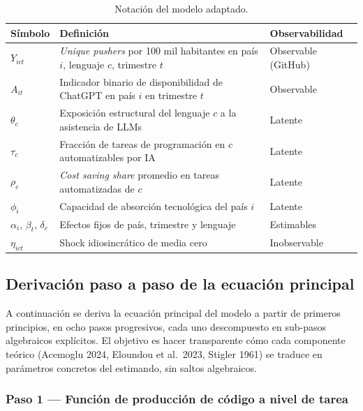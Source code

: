 \documentclass[11pt,a4paper]{article}
\theoremstyle{definition}
\begin{document}
\begin{table}[h!]
\centering
\small
\renewcommand{\arraystretch}{1.30}
\begin{tabular}{p{1.6cm}p{8cm}p{4cm}}
\toprule
\textbf{Símbolo} & \textbf{Definición} & \textbf{Observabilidad} \\
\midrule
$Y_{ict}$ & \textit{Unique pushers} por 100 mil habitantes en país $i$, lenguaje $c$, trimestre $t$ & Observable (GitHub) \\
$A_{it}$ & Indicador binario de disponibilidad de ChatGPT en país $i$ en trimestre $t$ & Observable \\
$\theta_c$ & Exposición estructural del lenguaje $c$ a la asistencia de LLMs & Latente \\
$\tau_c$ & Fracción de tareas de programación en $c$ automatizables por IA & Latente \\
$\rho_c$ & \textit{Cost saving share} promedio en tareas automatizadas de $c$ & Latente \\
$\phi_i$ & Capacidad de absorción tecnológica del país $i$ & Latente \\
$\alpha_i,\,\beta_t,\,\delta_c$ & Efectos fijos de país, trimestre y lenguaje & Estimables \\
$\eta_{ict}$ & Shock idiosincrático de media cero & Inobservable \\
\bottomrule
\end{tabular}
\caption{Notación del modelo adaptado.}
\end{table}

\subsection{Derivación paso a paso de la ecuación principal}
\label{sec:derivacion}

A continuación se deriva la ecuación principal del modelo a partir de primeros principios, en ocho pasos progresivos, cada uno descompuesto en sub-pasos algebraicos explícitos. El objetivo es hacer transparente cómo cada componente teórico (Acemoglu 2024, Eloundou et al.\ 2023, Stigler 1961) se traduce en parámetros concretos del estimando, sin saltos algebraicos.

\subsubsection*{Paso 1 --- Función de producción de código a nivel de tarea}
\end{document}
